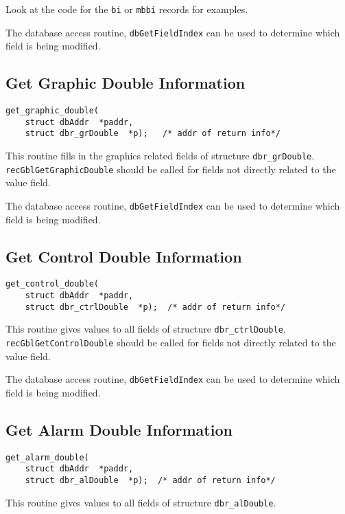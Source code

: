 Look at the code for the \verb|bi| or \verb|mbbi| records for examples.

The database access routine, \verb|dbGetFieldIndex| can be used to determine which field is being modified.

\subsection{Get Graphic Double Information}

\begin{verbatim}
get_graphic_double(
    struct dbAddr  *paddr,
    struct dbr_grDouble  *p);   /* addr of return info*/
\end{verbatim}This routine fills in the graphics related fields of structure \verb|dbr_grDouble|. \verb|recGblGetGraphicDouble| should be 
called for fields not directly related to the value field.

The database access routine, \verb|dbGetFieldIndex| can be used to determine which field is being modified.

\subsection{Get Control Double Information}

\begin{verbatim}
get_control_double(
    struct dbAddr  *paddr,
    struct dbr_ctrlDouble  *p);  /* addr of return info*/
\end{verbatim}This routine gives values to all fields of structure \verb|dbr_ctrlDouble|. \verb|recGblGetControlDouble| should be called 
for fields not directly related to the value field.

The database access routine, \verb|dbGetFieldIndex| can be used to determine which field is being modified.

\subsection{Get Alarm Double Information}

\begin{verbatim}
get_alarm_double(
    struct dbAddr  *paddr,
    struct dbr_alDouble  *p);  /* addr of return info*/
\end{verbatim}This routine gives values to all fields of structure \verb|dbr_alDouble|.

